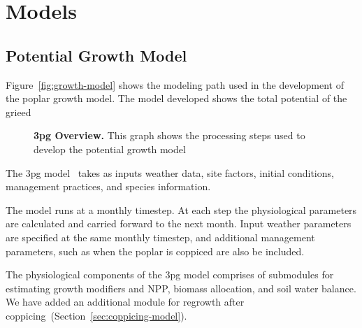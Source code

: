 \documentclass[10pt]{article}
\begin{document}
\section*{Models}

\subsection*{Potential Growth Model}

Figure~\ref{fig:growth-model} shows the modeling path used in the
development of the poplar growth model. The model developed shows the
total potential of the grieed

\begin{figure}[!ht]

\caption{ \textbf{\ac{3pg} Overview.} This graph shows
  the processing steps used to develop the potential growth model }
\label{fig:grow}
\end{figure}

The \acf{3pg} model~\cite{landsberg2010physiological} takes as inputs
weather data, site factors, initial conditions, management practices,
and species information.

The model runs at a monthly timestep. At each step the physiological
parameters are calculated and carried forward to the next month. Input
weather parameters are specified at the same monthly timestep, and
additional management parameters, such as when the poplar is coppiced
are also be included.

The physiological components of the \ac{3pg} model comprises of
submodules for estimating growth modifiers and \ac{NPP}, biomass
allocation, and soil water balance.  We have added an additional
module for regrowth after
coppicing~(Section~\ref{sec:coppicing-model}).

\end{document}
